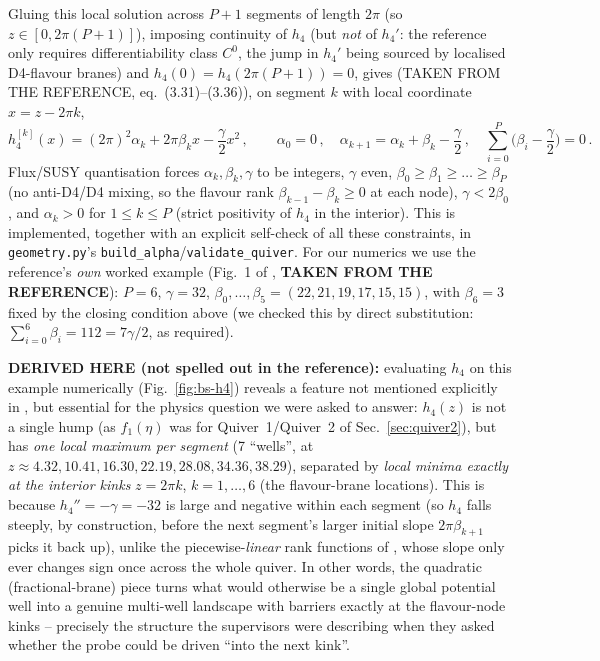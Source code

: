 \documentclass[11pt]{article}
\begin{document}
Gluing this local solution across $P+1$ segments of length $2\pi$ (so $z\in[0,2\pi(P{+}1)]$), imposing continuity of $h_4$ (but \emph{not} of $h_4'$: the reference only requires differentiability class $C^0$, the jump in $h_4'$ being sourced by localised D4-flavour branes) and $h_4(0)=h_4(2\pi(P{+}1))=0$, gives (TAKEN FROM THE REFERENCE, eq.~(3.31)--(3.36)), on segment $k$ with local coordinate $x=z-2\pi k$,
\begin{equation}
h_4^{[k]}(x) = (2\pi)^2\alpha_k + 2\pi\beta_k x - \frac\gamma2 x^2\,,
\qquad
\alpha_0=0\,,\quad
\alpha_{k+1}=\alpha_k+\beta_k-\frac\gamma2\,,\quad
\sum_{i=0}^{P}\Big(\beta_i-\frac\gamma2\Big)=0\,.
\label{eq:bs-h4}
\end{equation}
Flux/SUSY quantisation forces $\alpha_k,\beta_k,\gamma$ to be integers, $\gamma$ even, $\beta_0\ge\beta_1\ge\dots\ge\beta_P$ (no anti-D4/D4 mixing, so the flavour rank $\beta_{k-1}-\beta_k\ge0$ at each node), $\gamma<2\beta_0$, and $\alpha_k>0$ for $1\le k\le P$ (strict positivity of $h_4$ in the interior). This is implemented, together with an explicit self-check of all these constraints, in \texttt{geometry.py}'s \texttt{build\_alpha}/\texttt{validate\_quiver}. For our numerics we use the reference's \emph{own} worked example (Fig.~1 of \cite{Couzens:2021tnq}, \textbf{TAKEN FROM THE REFERENCE}): $P=6$, $\gamma=32$, $\beta_0,\dots,\beta_5=(22,21,19,17,15,15)$, with $\beta_6=3$ fixed by the closing condition above (we checked this by direct substitution: $\sum_{i=0}^6\beta_i=112=7\gamma/2$, as required).

\textbf{DERIVED HERE (not spelled out in the reference):} evaluating $h_4$ on this example numerically (Fig.~\ref{fig:bs-h4}) reveals a feature not mentioned explicitly in \cite{Couzens:2021tnq}, but essential for the physics question we were asked to answer: $h_4(z)$ is not a single hump (as $f_1(\eta)$ was for Quiver~1/Quiver~2 of Sec.~\ref{sec:quiver2}), but has \emph{one local maximum per segment} (7 ``wells'', at $z\approx4.32,10.41,16.30,22.19,28.08,34.36,38.29$), separated by \emph{local minima exactly at the interior kinks} $z=2\pi k$, $k=1,\dots,6$ (the flavour-brane locations). This is because $h_4''=-\gamma=-32$ is large and negative within each segment (so $h_4$ falls steeply, by construction, before the next segment's larger initial slope $2\pi\beta_{k+1}$ picks it back up), unlike the piecewise-\emph{linear} rank functions of \cite{Fatemiabhari:2025qcg}, whose slope only ever changes sign once across the whole quiver. In other words, the quadratic (fractional-brane) piece turns what would otherwise be a single global potential well into a genuine multi-well landscape with barriers exactly at the flavour-node kinks -- precisely the structure the supervisors were describing when they asked whether the probe could be driven ``into the next kink''.
\end{document}
